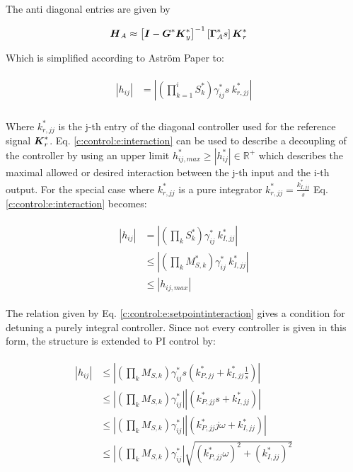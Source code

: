 The anti diagonal entries are given by

\begin{align}
\begin{split}
\mbox{\boldmath$H$}_A &\approx \left[ \mbox{\boldmath$I$}  - \mbox{\boldmath$G$}^* \mbox{\boldmath$K$}_y^* \right]^{-1} \left[\mbox{\boldmath$\Gamma$}_A^* s \right] \mbox{\boldmath$K$}_r^*
\end{split}
\end{align}

Which is simplified according to Aström Paper to:

\begin{align}
\begin{split}
|h_{ij}| &= \left|\left(\prod_{k = 1}^{i} S_{k}^*\right)\gamma_{ij}^*s ~k^*_{r,jj} \right| \\
\end{split}
\label{c:control:e:interaction}
\end{align}

Where $k^*_{r,jj}$ is the j-th entry of the diagonal controller used for the reference signal $\mbox{\boldmath$K$}_r^*$. Eq. \ref{c:control:e:interaction} can be used to describe a decoupling of the controller by using an upper limit $h_{ij,max}^* \geq |h_{ij}^*| \in \mathbb{R}^+$ which describes the maximal allowed or desired interaction between the j-th input and the i-th output. For the special case where $k^*_{r,jj}$ is a pure integrator $k_{r,jj}^* = \frac{k_{I,jj}^*}{s}$ Eq. \ref{c:control:e:interaction} becomes:

\begin{align}
\begin{split}
\left| h_{ij} \right| &= \left|\left(\prod_k S_k^*\right) \gamma^*_{ij}~ k^*_{I,jj} \right| \\
& \leq \left|\left(\prod_k M_{S,k}^*\right) \gamma^*_{ij}~ k^*_{I,jj} \right| \\
& \leq \left|h_{ij,max}\right|
\end{split}
\label{c:control:e:setpointinteraction}
\end{align}

The relation given by Eq. \ref{c:control:e:setpointinteraction} gives a condition for detuning a purely integral controller. Since not every controller is given in this form, the structure is extended to PI control by:

\begin{align}
\begin{split}
\left|h_{ij}\right| &\leq \left| \left(\prod_k M_{S,k} \right) \gamma_{ij}^* s \left(k_{P,jj}^* + k_{I,jj}^* \frac{1}{s} \right) \right| \\
&\leq \left| \left(\prod_k M_{S,k} \right) \gamma_{ij}^*\right| \left|\left(k_{P,jj}^* s+ k_{I,jj}^* \right) \right| \\
&\leq \left| \left(\prod_k M_{S,k} \right) \gamma_{ij}^*\right| \left|\left(k_{P,jj}^* j\omega+ k_{I,jj}^* \right) \right| \\
&\leq \left| \left(\prod_k M_{S,k} \right) \gamma_{ij}^*\right| \sqrt{\left(k_{P,jj}^*\omega\right)^2+ \left(k_{I,jj}^*\right)^2} \\
\end{split}
\label{c:control:e:TransformedPIDetuning}
\end{align}

